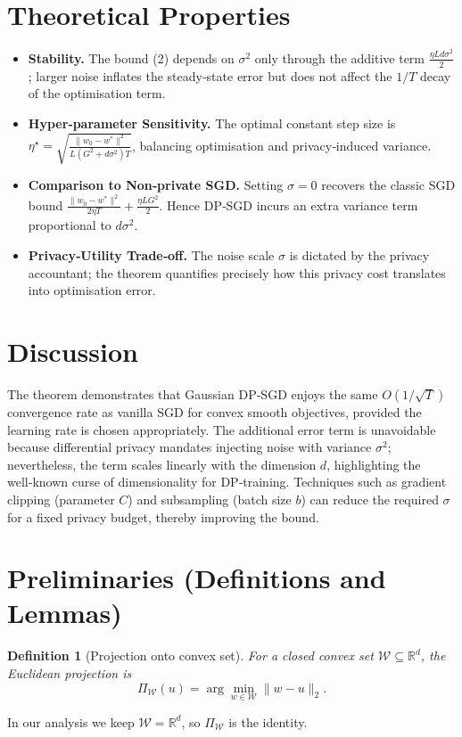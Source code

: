 \documentclass{article}
\newtheorem{definition}{Definition}
\begin{document}
\section*{Theoretical Properties}
\begin{itemize}
    \item \textbf{Stability.} The bound (2) depends on $\sigma^{2}$ only through the additive term $\frac{\eta L d\sigma^{2}}{2}$; larger noise inflates the steady‑state error but does not affect the $1/T$ decay of the optimisation term.
    \item \textbf{Hyper‑parameter Sensitivity.} The optimal constant step size is $\eta^{\star}= \sqrt{\frac{\|w_{0}-w^{*}\|^{2}}{L(G^{2}+d\sigma^{2})T}}$, balancing optimisation and privacy‑induced variance.
    \item \textbf{Comparison to Non‑private SGD.} Setting $\sigma=0$ recovers the classic SGD bound
    $\frac{\|w_{0}-w^{*}\|^{2}}{2\eta T}+\frac{\eta L G^{2}}{2}$. Hence DP‑SGD incurs an extra variance term proportional to $d\sigma^{2}$.
    \item \textbf{Privacy‑Utility Trade‑off.} The noise scale $\sigma$ is dictated by the privacy accountant; the theorem quantifies precisely how this privacy cost translates into optimisation error.
\end{itemize}

\section*{Discussion}
The theorem demonstrates that Gaussian DP‑SGD enjoys the same $O(1/\sqrt{T})$ convergence rate as vanilla SGD for convex smooth objectives, provided the learning rate is chosen appropriately. The additional error term is unavoidable because differential privacy mandates injecting noise with variance $\sigma^{2}$; nevertheless, the term scales linearly with the dimension $d$, highlighting the well‑known curse of dimensionality for DP‑training. Techniques such as gradient clipping (parameter $C$) and subsampling (batch size $b$) can reduce the required $\sigma$ for a fixed privacy budget, thereby improving the bound.

\newpage

\section*{Preliminaries (Definitions and Lemmas)}
\begin{definition}[Projection onto convex set]\label{def:proj}
For a closed convex set $\mathcal{W}\subseteq\mathbb{R}^{d}$, the Euclidean projection is
\[
\Pi_{\mathcal{W}}(u)=\arg\min_{w\in\mathcal{W}}\|w-u\|_{2}.
\]
\end{definition}
In our analysis we keep $\mathcal{W}=\mathbb{R}^{d}$, so $\Pi_{\mathcal{W}}$ is the identity.
\end{document}

